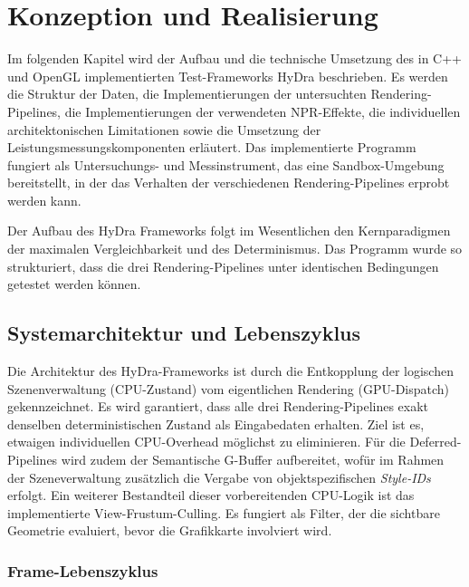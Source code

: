 \chapter{Konzeption und Realisierung}
\label{ch:04_konzeption_realisierung}

Im folgenden Kapitel wird der Aufbau und die technische Umsetzung des in C++ und OpenGL
implementierten Test-Frameworks \ac{HyDra} beschrieben.
Es werden die Struktur der Daten, die Implementierungen der untersuchten Rendering-Pipelines, die Implementierungen der
verwendeten \ac{NPR}-Effekte, die individuellen architektonischen Limitationen sowie die Umsetzung der
Leistungsmessungskomponenten erläutert.
Das implementierte Programm fungiert als Untersuchungs- und Messinstrument, das eine Sandbox-Umgebung bereitstellt, in
der das Verhalten der verschiedenen Rendering-Pipelines erprobt werden kann.

Der Aufbau des \ac{HyDra} Frameworks folgt im Wesentlichen den Kernparadigmen der maximalen Vergleichbarkeit und des
Determinismus.
Das Programm wurde so strukturiert, dass die drei Rendering-Pipelines unter identischen Bedingungen getestet werden
können.


\section{Systemarchitektur und Lebenszyklus}
\label{sec:0401_system_architecture_and_lifecycle}

Die Architektur des \ac{HyDra}-Frameworks ist durch die Entkopplung der logischen Szenenverwaltung (\ac{CPU}-Zustand)
vom eigentlichen Rendering (\ac{GPU}-Dispatch) gekennzeichnet.
Es wird garantiert, dass alle drei Rendering-Pipelines exakt denselben deterministischen Zustand als Eingabedaten
erhalten.
Ziel ist es, etwaigen individuellen \ac{CPU}-Overhead möglichst zu eliminieren.
Für die Deferred-Pipelines wird zudem der Semantische G-Buffer aufbereitet, wofür im Rahmen der Szeneverwaltung
zusätzlich die Vergabe von objektspezifischen \textit{Style-IDs} erfolgt.
Ein weiterer Bestandteil dieser vorbereitenden \ac{CPU}-Logik ist das implementierte View-Frustum-Culling.
Es fungiert als Filter, der die sichtbare Geometrie evaluiert, bevor die Grafikkarte involviert wird.

\subsection{Frame-Lebenszyklus}
\label{subsec:040101_frame_lifecycle}

